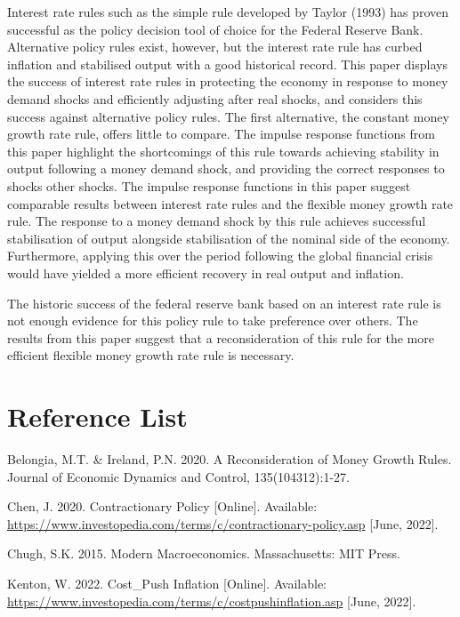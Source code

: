 \documentclass[11pt,preprint, authoryear]{elsarticle}
\numberwithin{equation}{section}
\numberwithin{figure}{section}
\numberwithin{table}{section}
\begin{document}
Interest rate rules such as the simple rule developed by Taylor (1993)
has proven successful as the policy decision tool of choice for the
Federal Reserve Bank. Alternative policy rules exist, however, but the
interest rate rule has curbed inflation and stabilised output with a
good historical record. This paper displays the success of interest rate
rules in protecting the economy in response to money demand shocks and
efficiently adjusting after real shocks, and considers this success
against alternative policy rules. The first alternative, the constant
money growth rate rule, offers little to compare. The impulse response
functions from this paper highlight the shortcomings of this rule
towards achieving stability in output following a money demand shock,
and providing the correct responses to shocks other shocks. The impulse
response functions in this paper suggest comparable results between
interest rate rules and the flexible money growth rate rule. The
response to a money demand shock by this rule achieves successful
stabilisation of output alongside stabilisation of the nominal side of
the economy. Furthermore, applying this over the period following the
global financial crisis would have yielded a more efficient recovery in
real output and inflation.

The historic success of the federal reserve bank based on an interest
rate rule is not enough evidence for this policy rule to take preference
over others. The results from this paper suggest that a reconsideration
of this rule for the more efficient flexible money growth rate rule is
necessary.

\newpage

\hypertarget{reference-list}{%
\section{Reference List}\label{reference-list}}

Belongia, M.T. \& Ireland, P.N. 2020. A Reconsideration of Money Growth
Rules. Journal of Economic Dynamics and Control, 135(104312):1-27.

Chen, J. 2020. Contractionary Policy {[}Online{]}. Available:
\url{https://www.investopedia.com/terms/c/contractionary-policy.asp}
{[}June, 2022{]}.

Chugh, S.K. 2015. Modern Macroeconomics. Massachusetts: MIT Press.

Kenton, W. 2022. Cost\_Push Inflation {[}Online{]}. Available:
\url{https://www.investopedia.com/terms/c/costpushinflation.asp}
{[}June, 2022{]}.
\end{document}
